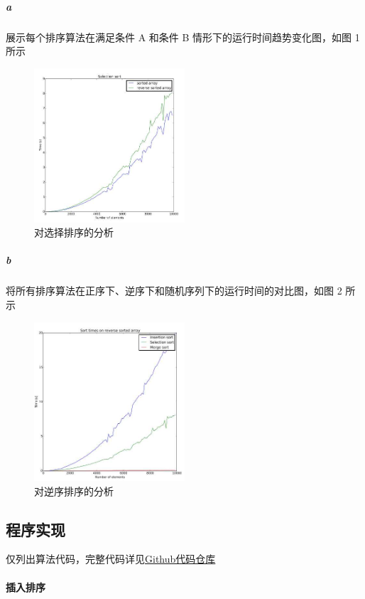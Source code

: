 \documentclass[UTF8]{ctexart}
\begin{document}
        \subparagraph{a} 展示每个排序算法在满足条件 A 和条件 B 情形下的运行时间趋势变化图，如图 1 所示

        \begin{figure}[H]
          \caption{对选择排序的分析}
          \centering
          \includegraphics[width=0.5\textwidth]{example1}
        \end{figure}

        \subparagraph{b} 将所有排序算法在正序下、逆序下和随机序列下的运行时间的对比图，如图 2 所示

        \begin{figure}[H]
          \caption{对逆序排序的分析}
          \centering
          \includegraphics[width=0.5\textwidth]{example2}
        \end{figure}

    \subsection{程序实现}
    仅列出算法代码，完整代码详见\href{https://github.com/sylxjtu/datastructure-homework/tree/master/homework1/src}{Github代码仓库}
      \paragraph{插入排序}
      \inputminted{java}{src/InsertionSort.java}
\end{document}
